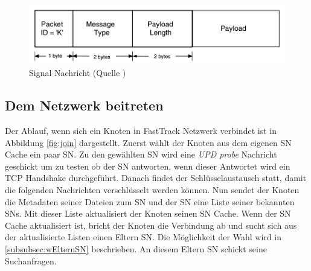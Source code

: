 \begin{figure}
\includegraphics[scale=0.25]{gfx/signal_message}
\caption{Signal Nachricht (Quelle \cite{liang2006fasttrack})}
\label{fig:sigN}
\end{figure}

\subsection{Dem Netzwerk beitreten}
\label{subsec:join}

Der Ablauf, wenn sich ein Knoten in FastTrack Netzwerk verbindet ist in Abbildung \ref{fig:join} dargestellt.
Zuerst wählt der Knoten aus dem eigenen SN Cache ein paar SN.
Zu den gewählten SN wird eine \textit{UPD probe} Nachricht geschickt um zu testen ob der SN antworten, wenn dieser Antwortet wird ein TCP Handshake durchgeführt. 
Danach findet der Schlüsselaustausch statt, damit die folgenden Nachrichten verschlüsselt werden können.
Nun sendet der Knoten die Metadaten seiner Dateien zum SN und der SN eine Liste seiner bekannten SNs.
Mit dieser Liste aktualisiert der Knoten seinen SN Cache.
Wenn der SN Cache aktualisiert ist, bricht der Knoten die Verbindung ab und sucht sich aus der aktualisierte Listen einen Eltern SN. Die Möglichkeit der Wahl wird in \ref{subsubsec:wElternSN} beschrieben.
An diesem Eltern SN schickt seine Suchanfragen.

